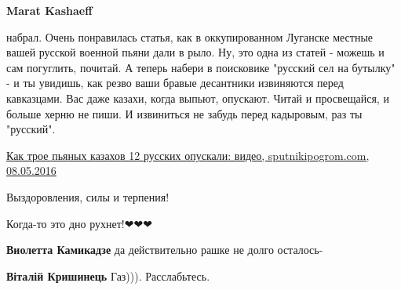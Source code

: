 \begin{itemize}
\begin{itemize}
 
\textbf{Marat Kashaeff} 

набрал. Очень понравилась статья, как в оккупированном Луганске местные вашей
русской военной пьяни дали в рыло. Ну, это одна из статей - можешь и сам
погуглить, почитай. А теперь набери в поисковике "русский сел на бутылку" - и
ты увидишь, как резво ваши бравые десантники извиняются перед кавказцами. Вас
даже казахи, когда выпьют, опускают. Читай и просвещайся, и больше херню не
пиши. И извиниться не забудь перед кадыровым, раз ты "русский".

\href{https://sputnikipogrom.com/society/54816/3-vs-12/}{%
Как трое пьяных казахов 12 русских опускали: видео, sputnikipogrom.com, 08.05.2016%
}

\end{itemize}

 

Выздоровления, силы и терпения!

Когда-то это дно рухнет!❤❤❤

\begin{itemize}
 
\textbf{Виолетта Камикадзе} да действительно рашке не долго осталось-

 
\textbf{Віталій Кришинець} Газ))). Расслабьтесь.
\end{itemize}

 


\end{itemize}
